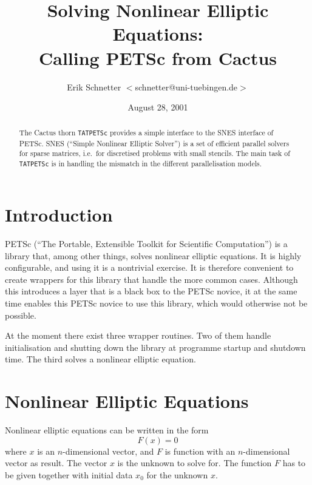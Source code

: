 \documentclass[12pt]{article}
\begin{document}
\title{Solving Nonlinear Elliptic Equations:\\ Calling PETSc from
  Cactus}

\author{Erik Schnetter $<$schnetter@uni-tuebingen.de$>$}

\date{August 28, 2001}

\maketitle

\begin{abstract}
  The Cactus thorn \texttt{TATPETSc} provides a simple interface to
  the SNES interface of PETSc.  SNES (``Simple Nonlinear Elliptic
  Solver'') is a set of efficient parallel solvers for sparse
  matrices, i.e.\ for discretised problems with small stencils.  The
  main task of \texttt{TATPETSc} is in handling the mismatch in the
  different parallelisation models.
\end{abstract}

\tableofcontents

\section{Introduction}

PETSc (``The Portable, Extensible Toolkit for Scientific
Computation'') \cite{TAT:TATPETSc:petsc} is a library that, among
other things, solves nonlinear elliptic equations.  It is highly
configurable, and using it is a nontrivial exercise.  It is therefore
convenient to create wrappers for this library that handle the more
common cases.  Although this introduces a layer that is a black box to
the PETSc novice, it at the same time enables this PETSc novice to use
this library, which would otherwise not be possible.

At the moment there exist three wrapper routines.  Two of them handle
initialisation and shutting down the library at programme startup and
shutdown time.  The third solves a nonlinear elliptic equation.

\section{Nonlinear Elliptic Equations}

Nonlinear elliptic equations can be written in the form
$$
F(x) = 0
$$
where $x$ is an $n$-dimensional vector, and $F$ is function with an
$n$-dimensional vector as result.  The vector $x$ is the unknown to
solve for.  The function $F$ has to be given together with initial
data $x_0$ for the unknown $x$.
\end{document}
